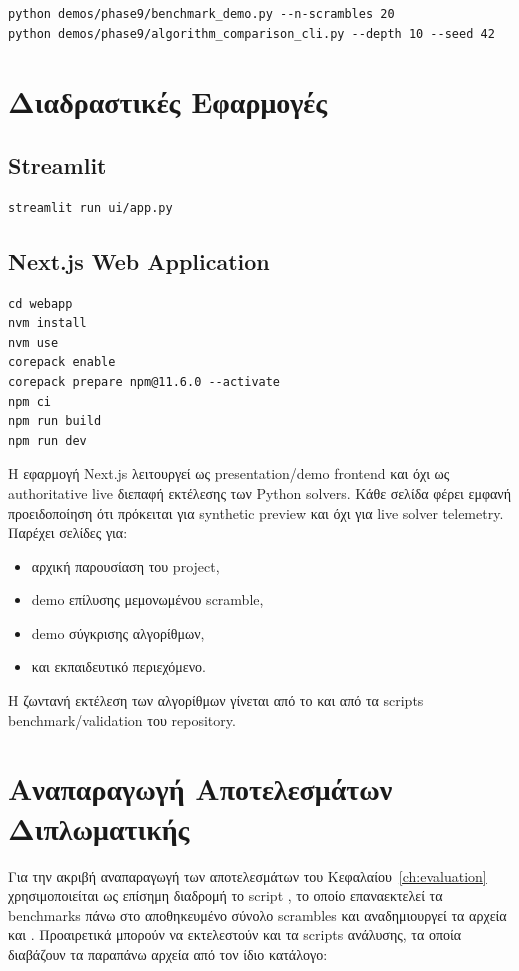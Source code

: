 \begin{lstlisting}
python demos/phase9/benchmark_demo.py --n-scrambles 20
python demos/phase9/algorithm_comparison_cli.py --depth 10 --seed 42
\end{lstlisting}

\section{Διαδραστικές Εφαρμογές}

\subsection{Streamlit}

\begin{lstlisting}
streamlit run ui/app.py
\end{lstlisting}

\subsection{Next.js Web Application}

\begin{lstlisting}
cd webapp
nvm install
nvm use
corepack enable
corepack prepare npm@11.6.0 --activate
npm ci
npm run build
npm run dev
\end{lstlisting}

Η εφαρμογή Next.js λειτουργεί ως presentation/demo frontend και όχι ως authoritative live διεπαφή εκτέλεσης των Python solvers. Κάθε σελίδα φέρει εμφανή προειδοποίηση ότι πρόκειται για synthetic preview και όχι για live solver telemetry. Παρέχει σελίδες για:
\begin{itemize}
    \item αρχική παρουσίαση του project,
    \item demo επίλυσης μεμονωμένου scramble,
    \item demo σύγκρισης αλγορίθμων,
    \item και εκπαιδευτικό περιεχόμενο.
\end{itemize}
Η ζωντανή εκτέλεση των αλγορίθμων γίνεται από το  και από τα scripts benchmark/validation του repository.

\section{Αναπαραγωγή Αποτελεσμάτων Διπλωματικής}

Για την ακριβή αναπαραγωγή των αποτελεσμάτων του Κεφαλαίου~\ref{ch:evaluation}
χρησιμοποιείται ως επίσημη διαδρομή το script
, το οποίο
επαναεκτελεί τα benchmarks πάνω στο αποθηκευμένο σύνολο scrambles και
αναδημιουργεί τα αρχεία
 και
. Προαιρετικά
μπορούν να εκτελεστούν και τα scripts ανάλυσης, τα οποία διαβάζουν τα παραπάνω
αρχεία από τον ίδιο κατάλογο:

